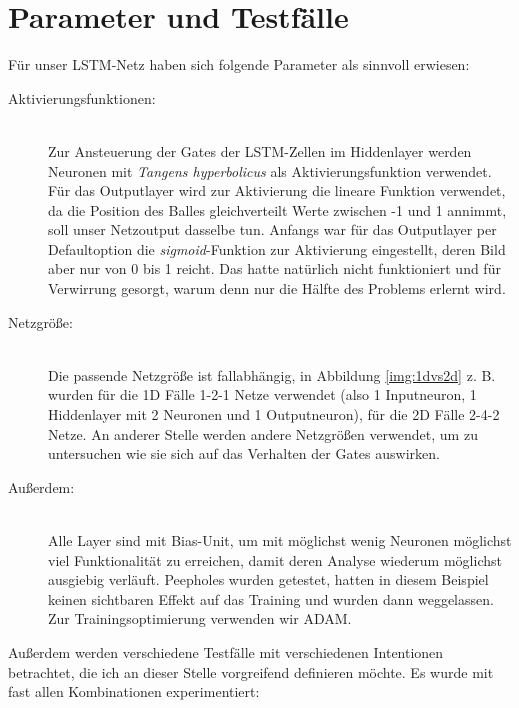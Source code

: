 \section{Parameter und Testfälle}
Für unser LSTM-Netz haben sich folgende Parameter als sinnvoll erwiesen:
\begin{description}	\item[Aktivierungsfunktionen:]\hfill \\ 
	Zur Ansteuerung der Gates der LSTM-Zellen im Hiddenlayer werden Neuronen mit \textit{Tangens hyperbolicus} als Aktivierungsfunktion verwendet. Für das Outputlayer wird zur Aktivierung die lineare Funktion verwendet, da die Position des Balles gleichverteilt Werte zwischen -1 und 1 annimmt, soll unser Netzoutput dasselbe tun. Anfangs war für das Outputlayer per Defaultoption die \textit{sigmoid}-Funktion zur Aktivierung eingestellt, deren Bild aber nur von 0 bis 1 reicht. Das hatte natürlich nicht funktioniert und für Verwirrung gesorgt, warum denn nur die Hälfte des Problems erlernt wird.  
	\item[Netzgröße:]\hfill \\ 
	Die passende Netzgröße ist fallabhängig, in Abbildung \ref{img:1dvs2d} z. B. wurden für die 1D Fälle 1-2-1 Netze verwendet (also 1 Inputneuron, 1 Hiddenlayer mit 2 Neuronen und 1 Outputneuron), für die 2D Fälle 2-4-2 Netze. An anderer Stelle werden andere Netzgrößen verwendet, um zu untersuchen wie sie sich auf das Verhalten der Gates auswirken.
	\item[Außerdem:]\hfill \\
	Alle Layer sind mit Bias-Unit, um mit möglichst wenig Neuronen möglichst viel Funktionalität zu erreichen, damit deren Analyse wiederum möglichst ausgiebig verläuft. Peepholes wurden getestet, hatten in diesem Beispiel keinen sichtbaren Effekt auf das Training und wurden dann weggelassen. Zur Trainingsoptimierung verwenden wir ADAM.
\end{description}
Außerdem werden verschiedene Testfälle mit verschiedenen Intentionen betrachtet, die ich an dieser Stelle vorgreifend definieren möchte. Es wurde mit fast allen Kombinationen experimentiert:
